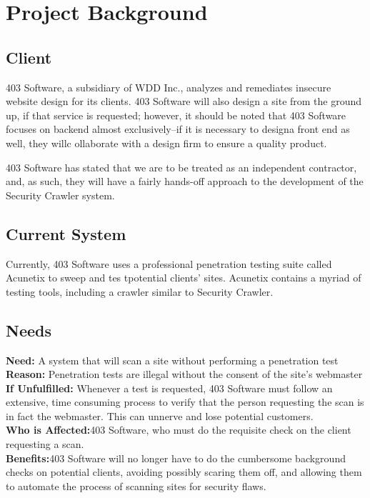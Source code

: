 \section{Project Background}
\subsection{Client}
403 Software, a subsidiary of WDD Inc., analyzes and remediates insecure website design for its clients.  403 Software will also design a site from the ground up, if that service is requested; however, it should be noted that 403 Software focuses on backend almost exclusively--if it is necessary to designa  front end as well, they willc ollaborate with a design firm to ensure a quality product.

403 Software has stated that we are to be treated as an independent contractor, and, as such, they will have a fairly hands-off approach to the development of the Security Crawler system.

\subsection{Current System}

Currently, 403 Software uses a professional penetration testing suite called Acunetix to sweep and tes tpotential clients' sites.  Acunetix contains a myriad of testing tools, including a crawler similar to Security Crawler.

\subsection{Needs}

\textbf{Need: }A system that will scan a site without performing a penetration test\\
\textbf{Reason: }Penetration tests are illegal without the consent of the site's webmaster\\
\textbf{If Unfulfilled: }Whenever a test is requested, 403 Software must follow an extensive, time consuming process to verify that the person requesting the scan is in fact the webmaster.  This can unnerve and lose potential customers.\\
\textbf{Who is Affected:}403 Software, who must do the requisite check on the client requesting a scan.\\
\textbf{Benefits:}403 Software will no longer have to do the cumbersome background checks on potential clients, avoiding possibly scaring them off, and allowing them to automate the process of scanning sites for security flaws.

